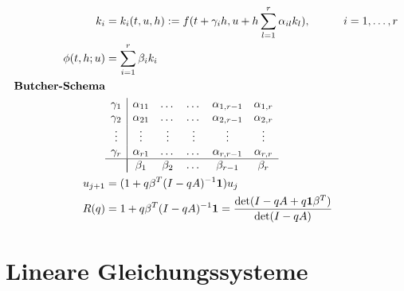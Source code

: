 \documentclass[
	ngerman,
	accentcolor=9c,%
	type=intern,
	marginpar=false
	]{tudapub}
\begin{document}
            \begin{align*}
                k_i &= k_i(t,u,h) := f(t + \gamma_i h, u+h \sum_{l=1}^r\alpha_{il} k_l), & i&= 1, \dots,r\\
                \phi(t,h;u) &= \sum_{i=1}^r \beta_i k_i \\
                \textbf{Butcher-Schema}& \\
                &
                \begin{array} {c | c c c c c}
                    \gamma_1 &  \alpha_{11} & \dots & \dots & \alpha_{1,r-1} & \alpha_{1,r}\\
                    \gamma_2 &  \alpha_{21} & \dots & \dots & \alpha_{2,r-1} & \alpha_{2,r}\\
                    \vdots   &  \vdots & \vdots & \vdots &\vdots & \vdots\\
                    \gamma_r &  \alpha_{r1} & \dots & \dots & \alpha_{r,r-1} & \alpha_{r,r}\\
                    \hline\\[-\normalbaselineskip]
                    & \beta_1 & \beta_2 & \dots & \beta_{r-1} & \beta_{r}
                \end{array}\\
                u_{j+1} &= (1+ q\beta^T (I - qA)^{-1}\mathbf{1})u_j\\
                R(q) &= 1 + q\beta^T(I-qA)^{-1}\mathbf{1}= \dfrac{\det(I-qA+q\mathbf{1}\beta^T)}{\det(I-qA)}
            \end{align*}
            \newpage
    \section{Lineare Gleichungssysteme}
\end{document}

